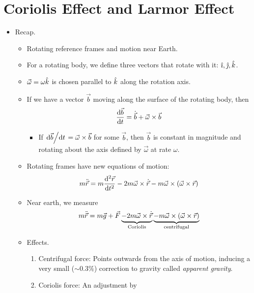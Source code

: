 \documentclass[../notes.tex]{subfiles}
\begin{document}
\section{Coriolis Effect and Larmor Effect}
\begin{itemize}
    \item {}Recap.
    \begin{itemize}
        \item Rotating reference frames and motion near Earth.
        \item For a rotating body, we define three vectors that rotate with it: $\hat{\imath},\hat{\jmath},\hat{k}$.
        \item $\vec{\omega}=\omega\hat{k}$ is chosen parallel to $\hat{k}$ along the rotation axis.
        \item If we have a vector $\vec{b}$ moving along the surface of the rotating body, then
        \begin{equation*}
            \dv{\vec{b}}{t} = \dot{\vec{b}}+\vec{\omega}\times\vec{b}
        \end{equation*}
        \begin{itemize}
            \item If $\dv*{\vec{b}}{t}=\vec{\omega}\times\vec{b}$ for some $\vec{b}$, then $\vec{b}$ is constant in magnitude and rotating about the axis defined by $\vec{\omega}$ at rate $\omega$.
        \end{itemize}
        \item Rotating frames have new equations of motion:
        \begin{equation*}
            m\ddot{\vec{r}} = m\dv[2]{\vec{r}}{t}-2m\vec{\omega}\times\dot{\vec{r}}-m\vec{\omega}\times(\vec{\omega}\times\vec{r})
        \end{equation*}
        \item Near earth, we measure
        \begin{equation*}
            m\ddot{\vec{r}} = m\vec{g}+\vec{F}\underbrace{-2m\vec{\omega}\times\dot{\vec{r}}\vphantom{()}}_\text{Coriolis}\underbrace{-m\vec{\omega}\times(\vec{\omega}\times\vec{r})}_\text{centrifugal}
        \end{equation*}
        \item Effects.
        \begin{enumerate}
            \item Centrifugal force: Points outwards from the axis of motion, inducing a very small ($\sim 0.3\%$) correction to gravity called \emph{apparent gravity}.
            \item Coriolis force: An adjustment by

\end{enumerate}
\end{itemize}
\end{itemize}
\end{document}
